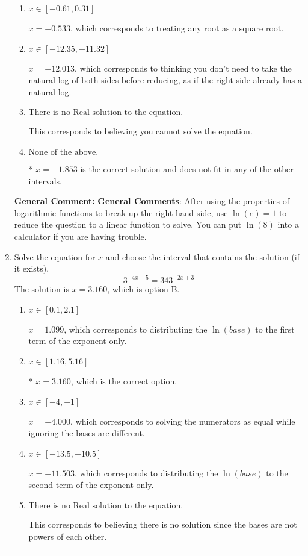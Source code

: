 \documentclass{extbook}[14pt]
\newcommand{\litem}[1]{\item #1

\rule{\textwidth}{0.4pt}}
\begin{document}
\begin{enumerate}
{\begin{enumerate}[label=\Alph*.]
$x = 1.853$, which is the negative of the correct solution.
\item \( x \in [-0.61, 0.31] \)

$x = -0.533$, which corresponds to treating any root as a square root.
\item \( x \in [-12.35, -11.32] \)

$x = -12.013$, which corresponds to thinking you don't need to take the natural log of both sides before reducing, as if the right side already has a natural log.
\item \( \text{There is no Real solution to the equation.} \)

This corresponds to believing you cannot solve the equation.
\item \( \text{None of the above.} \)

* $x = -1.853$ is the correct solution and does not fit in any of the other intervals.
\end{enumerate}

\textbf{General Comment:} \textbf{General Comments}: After using the properties of logarithmic functions to break up the right-hand side, use $\ln(e) = 1$ to reduce the question to a linear function to solve. You can put $\ln(8)$ into a calculator if you are having trouble.
}
\litem{
Solve the equation for $x$ and choose the interval that contains the solution (if it exists).
\[ 3^{-4x-5} = 343^{-2x+3} \]The solution is \( x = 3.160 \), which is option B.\begin{enumerate}[label=\Alph*.]
\item \( x \in [0.1, 2.1] \)

$x = 1.099$, which corresponds to distributing the $\ln(base)$ to the first term of the exponent only.
\item \( x \in [1.16, 5.16] \)

* $x = 3.160$, which is the correct option.
\item \( x \in [-4, -1] \)

$x = -4.000$, which corresponds to solving the numerators as equal while ignoring the bases are different.
\item \( x \in [-13.5, -10.5] \)

$x = -11.503$, which corresponds to distributing the $\ln(base)$ to the second term of the exponent only.
\item \( \text{There is no Real solution to the equation.} \)

This corresponds to believing there is no solution since the bases are not powers of each other.
\end{enumerate}

}
\end{enumerate}
\end{document}
